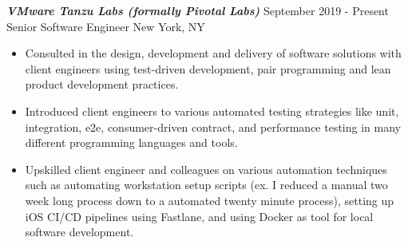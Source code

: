 {\sl \textbf{VMware Tanzu Labs (formally Pivotal Labs)}} \hfill September 2019 - Present \\ Senior Software Engineer \hfill New York, NY
\begin{itemize}
    \item Consulted in the design, development and delivery of software solutions with client engineers using test-driven development, pair programming and lean product development practices.
    \item Introduced client engineers to various automated testing strategies like unit, integration, e2e, consumer-driven contract, and performance testing in many different programming languages and tools.
    \item Upskilled client engineer and colleagues on various automation techniques such as automating workstation setup scripts (ex. I reduced a manual two week long process down to a automated twenty minute process), setting up iOS CI/CD pipelines using Fastlane, and using Docker as tool for local software development.
\end{itemize}
